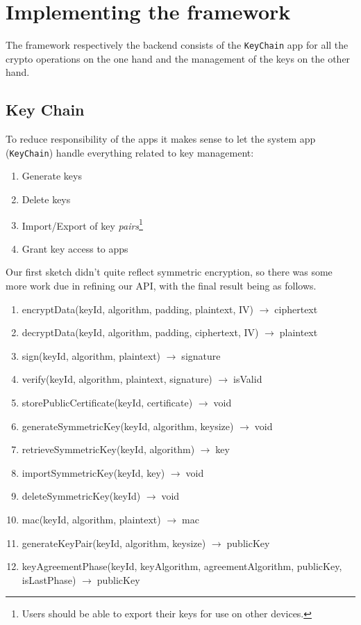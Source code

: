 \documentclass[a4paper,draft]{scrartcl}
\newcommand{\totype}{\(\to\;\)}
\begin{document}
\section{Implementing the framework}

	The framework respectively the backend consists of the \texttt{KeyChain} app for all the crypto operations on the one hand and the management of the keys on the other hand.

	\subsection{Key Chain}
		To reduce responsibility of the apps it makes sense to let the system app (\texttt{KeyChain}) handle everything related to key management:
		\begin{enumerate}
			\item Generate keys
			\item Delete keys
			\item Import/Export of key \emph{pairs}\footnote{Users should be able to export their keys for use on other devices.}
			\item Grant key access to apps
		\end{enumerate}
		Our first sketch didn't quite reflect symmetric encryption, so there was some more work due in refining our API, with the final result being as follows.

		\begin{enumerate}
		\tt
			\item encryptData(keyId, algorithm, padding, plaintext, IV) \totype ciphertext
			\item decryptData(keyId, algorithm, padding, ciphertext, IV) \totype plaintext
			\item sign(keyId, algorithm, plaintext) \totype signature
			\item verify(keyId, algorithm, plaintext, signature) \totype isValid
			\item storePublicCertificate(keyId, certificate) \totype void

			\item generateSymmetricKey(keyId, algorithm, keysize) \totype void
			\item retrieveSymmetricKey(keyId, algorithm) \totype key
			\item importSymmetricKey(keyId, key) \totype void
			\item deleteSymmetricKey(keyId) \totype void
			\item mac(keyId, algorithm, plaintext) \totype mac

			\item generateKeyPair(keyId, algorithm, keysize) \totype publicKey
			\item keyAgreementPhase(keyId, keyAlgorithm, agreementAlgorithm, publicKey, isLastPhase) \totype publicKey
		\end{enumerate}
\end{document}
